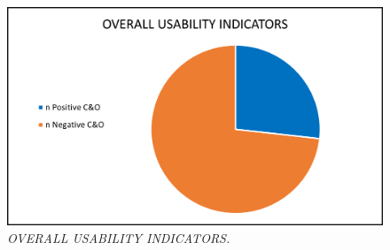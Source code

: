 \begin{figure}[h]
	\includegraphics[width=\textwidth]{UT_Visual_illustration_7.png}
	\caption{\textit{OVERALL USABILITY INDICATORS.}}
	\label{fig:label7}
\end{figure}
